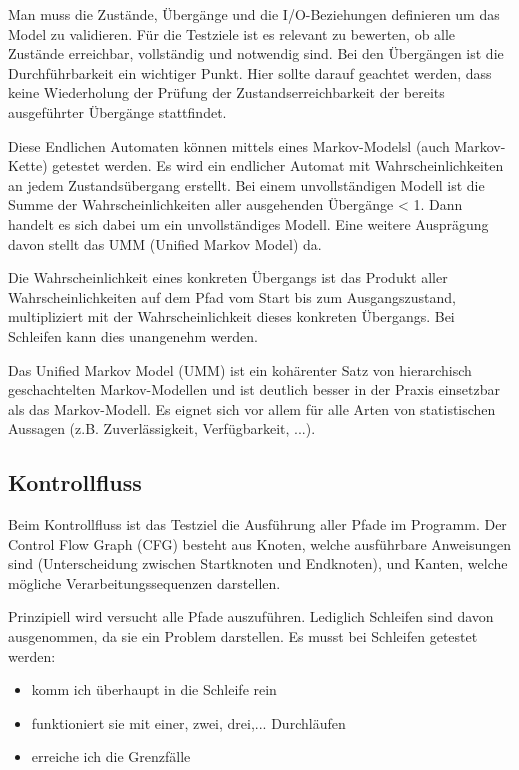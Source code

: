 Man muss die Zustände, Übergänge und die I/O-Beziehungen definieren um das Model zu validieren. Für die Testziele ist es relevant zu bewerten, ob alle Zustände erreichbar, vollständig und notwendig sind. Bei den Übergängen ist die Durchführbarkeit  ein wichtiger Punkt. Hier sollte darauf geachtet werden, dass keine Wiederholung der Prüfung der Zustandserreichbarkeit der bereits ausgeführter Übergänge stattfindet. 

Diese Endlichen Automaten können mittels eines Markov-Modelsl (auch Markov-Kette) getestet werden. Es wird ein endlicher Automat mit Wahrscheinlichkeiten an jedem Zustandsübergang erstellt. Bei einem unvollständigen Modell ist die Summe der Wahrscheinlichkeiten aller ausgehenden Übergänge < 1. Dann handelt es sich dabei um ein unvollständiges Modell. Eine weitere Ausprägung davon stellt das UMM (Unified Markov Model) da.

Die Wahrscheinlichkeit eines konkreten Übergangs ist das Produkt aller Wahrscheinlichkeiten auf dem Pfad vom Start bis zum Ausgangszustand, multipliziert mit der Wahrscheinlichkeit dieses konkreten Übergangs. Bei Schleifen kann dies unangenehm werden.

Das Unified Markov Model (UMM) ist ein kohärenter Satz von hierarchisch geschachtelten Markov-Modellen und ist deutlich besser in der Praxis einsetzbar als das Markov-Modell. Es eignet sich vor allem für alle Arten von statistischen Aussagen (z.B. Zuverlässigkeit, Verfügbarkeit, ...).

\subsection{Kontrollfluss}
Beim Kontrollfluss ist das Testziel die Ausführung aller Pfade im Programm. Der Control Flow Graph (CFG) besteht aus Knoten, welche ausführbare Anweisungen sind (Unterscheidung zwischen Startknoten und Endknoten), und Kanten, welche mögliche Verarbeitungssequenzen darstellen. 

Prinzipiell wird versucht alle Pfade auszuführen. Lediglich Schleifen sind davon ausgenommen, da sie ein Problem darstellen. Es musst bei Schleifen getestet werden:
\begin{itemize}
\item komm ich überhaupt in die Schleife rein
\item funktioniert sie mit einer, zwei, drei,... Durchläufen
\item erreiche ich die Grenzfälle
\end{itemize}

